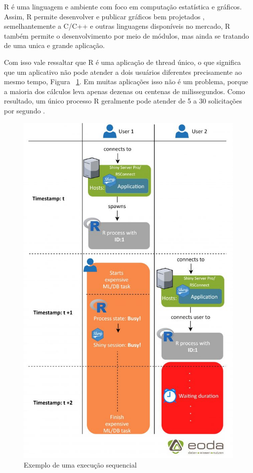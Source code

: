 \documentclass[12pt,english,brazil]{article}
\begin{document}
R é uma linguagem e ambiente com foco em computação estatística e gráficos. Assim, R permite desenvolver e publicar gráficos bem projetados \cite{whatR}, semelhantemente a C/C++ e outras linguagens disponíveis no mercado, R também permite o desenvolvimento por meio de módulos, mas ainda se tratando de uma unica e grande aplicação.

Com isso vale ressaltar que R é uma aplicação de thread único, o que significa que um aplicativo não pode atender a dois usuários diferentes precisamente ao mesmo tempo, Figura ~\ref{singleThreads}. Em muitas aplicações isso não é um problema, porque a maioria dos cálculos leva apenas dezenas ou centenas de milissegundos. Como resultado, um único processo R geralmente pode atender de 5 a 30 solicitações por segundo \cite{ShinyappsEscalabilidade}. 

\begin{figure}[htbp]
  \centering 
  \includegraphics[scale=.4]{figures/single_threads.jpg}
  \caption{Exemplo de uma execução sequencial \cite{singleThreads}}
  \label{singleThreads}
\end{figure}
\end{document}
